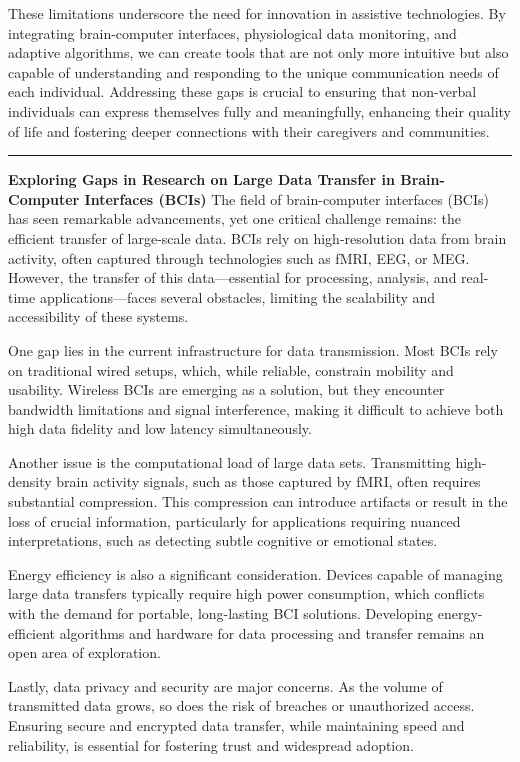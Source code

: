 \documentclass[12pt, research paper]{report}
\begin{document}
	\noindent These limitations underscore the need for innovation in assistive technologies. By integrating brain-computer interfaces, physiological data monitoring, and adaptive algorithms, we can create tools that are not only more intuitive but also capable of understanding and responding to the unique communication needs of each individual. Addressing these gaps is crucial to ensuring that non-verbal individuals can express themselves fully and meaningfully, enhancing their quality of life and fostering deeper connections with their caregivers and communities.
	
	\noindent \rule{13.85cm}{0.01cm}
	\textbf{Exploring Gaps in Research on Large Data Transfer in Brain-Computer Interfaces (BCIs)}
	\newline The field of brain-computer interfaces (BCIs) has seen remarkable advancements, yet one critical challenge remains: the efficient transfer of large-scale data. BCIs rely on high-resolution data from brain activity, often captured through technologies such as fMRI, EEG, or MEG. However, the transfer of this data—essential for processing, analysis, and real-time applications—faces several obstacles, limiting the scalability and accessibility of these systems.
	\bigskip 
	
	\noindent One gap lies in the current infrastructure for data transmission. Most BCIs rely on traditional wired setups, which, while reliable, constrain mobility and usability. Wireless BCIs are emerging as a solution, but they encounter bandwidth limitations and signal interference, making it difficult to achieve both high data fidelity and low latency simultaneously.
	\bigskip 
	
	\noindent Another issue is the computational load of large data sets. Transmitting high-density brain activity signals, such as those captured by fMRI, often requires substantial compression. This compression can introduce artifacts or result in the loss of crucial information, particularly for applications requiring nuanced interpretations, such as detecting subtle cognitive or emotional states.
	\bigskip 
	
	\noindent Energy efficiency is also a significant consideration. Devices capable of managing large data transfers typically require high power consumption, which conflicts with the demand for portable, long-lasting BCI solutions. Developing energy-efficient algorithms and hardware for data processing and transfer remains an open area of exploration.
	\bigskip 
	
	\noindent Lastly, data privacy and security are major concerns. As the volume of transmitted data grows, so does the risk of breaches or unauthorized access. Ensuring secure and encrypted data transfer, while maintaining speed and reliability, is essential for fostering trust and widespread adoption.
	\bigskip 
	
\end{document}
